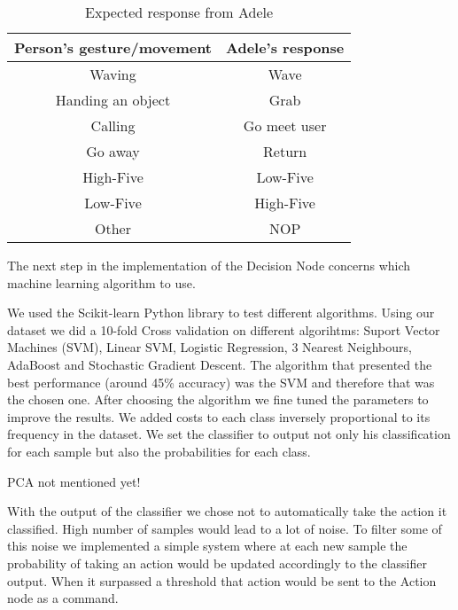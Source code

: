 \begin{table}[!h]
\centering
\caption{Expected response from Adele}
\label{tab:expected_response}
\begin{tabular}{|c|c|}
\hline
\textbf{Person's gesture/movement} & \textbf{Adele's response} \\ \hline
Waving                           & Wave                                 \\
Handing an object                & Grab                            		\\
Calling                          & Go meet user                         \\
Go away                          & Return                       \\
High-Five                        & Low-Five                             \\
Low-Five                         & High-Five                            \\
Other	                           & NOP                                  \\ \hline
\end{tabular}
\end{table}

The next step in the implementation of the Decision Node concerns which machine learning algorithm to use.

We used the Scikit-learn Python library \cite{Scikit-Learn} to test different algorithms. Using our dataset we did a 10-fold Cross validation on different algorihtms: Suport Vector Machines (SVM), Linear SVM, Logistic Regression, 3 Nearest Neighbours, AdaBoost and Stochastic Gradient Descent. The algorithm that presented the best performance (around 45\% accuracy) was the SVM and therefore that was the chosen one. After choosing the algorithm we fine tuned the parameters to improve the results. We added costs to each class inversely proportional to its frequency in the dataset. We set the classifier to output not only his classification for each sample but also the probabilities for each class.

\color{red} PCA not mentioned yet! \color{black}

With the output of the classifier we chose not to automatically take the action it classified. High number of samples would lead to a lot of noise. To filter some of this noise we implemented a simple system where at each new sample the probability of taking an action would be updated accordingly to the classifier output. When it surpassed a threshold that action would be sent to the Action node as a command.

